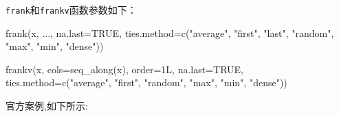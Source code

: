 \documentclass[
]{book}
\newenvironment{Shaded}{\begin{snugshade}}{\end{snugshade}}
\newcommand{\AttributeTok}[1]{\textcolor[rgb]{0.77,0.63,0.00}{#1}}
\newcommand{\ConstantTok}[1]{\textcolor[rgb]{0.00,0.00,0.00}{#1}}
\newcommand{\FunctionTok}[1]{\textcolor[rgb]{0.00,0.00,0.00}{#1}}
\newcommand{\NormalTok}[1]{#1}
\newcommand{\StringTok}[1]{\textcolor[rgb]{0.31,0.60,0.02}{#1}}
\begin{document}
\texttt{frank}和\texttt{frankv}函数参数如下：

\begin{Shaded}
\begin{Highlighting}[]
\FunctionTok{frank}\NormalTok{(x, ..., }\AttributeTok{na.last=}\ConstantTok{TRUE}\NormalTok{, }\AttributeTok{ties.method=}\FunctionTok{c}\NormalTok{(}\StringTok{"average"}\NormalTok{,}
  \StringTok{"first"}\NormalTok{, }\StringTok{"last"}\NormalTok{, }\StringTok{"random"}\NormalTok{, }\StringTok{"max"}\NormalTok{, }\StringTok{"min"}\NormalTok{, }\StringTok{"dense"}\NormalTok{))}

\FunctionTok{frankv}\NormalTok{(x, }\AttributeTok{cols=}\FunctionTok{seq\_along}\NormalTok{(x), }\AttributeTok{order=}\NormalTok{1L, }\AttributeTok{na.last=}\ConstantTok{TRUE}\NormalTok{,}
      \AttributeTok{ties.method=}\FunctionTok{c}\NormalTok{(}\StringTok{"average"}\NormalTok{, }\StringTok{"first"}\NormalTok{, }\StringTok{"random"}\NormalTok{,}
        \StringTok{"max"}\NormalTok{, }\StringTok{"min"}\NormalTok{, }\StringTok{"dense"}\NormalTok{))}
\end{Highlighting}
\end{Shaded}

官方案例,如下所示:
\end{document}
